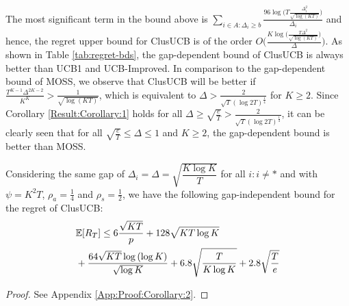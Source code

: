 The most significant term in the bound above is $\sum_{i\in A:\Delta_{i}\geq b}\frac{96\log{\big(T\frac{\Delta_{i}^{2}}{\sqrt{\log (KT)}}\big)}}{\Delta_{i}}$ and hence, the regret upper bound for ClusUCB is of the order $O\bigg(\frac{K\log \big(\frac{T\Delta^{2}}{\sqrt{\log (KT)}}\big)}{\Delta}\bigg)$. As shown in Table \ref{tab:regret-bds}, the gap-dependent bound of ClusUCB is always better than UCB1 and UCB-Improved. 
%
In comparison to the gap-dependent bound of MOSS, we observe that ClusUCB will be better if 
$\frac{T^{K-1}\Delta^{2K-2}}{K^{K}} > \frac{1}{\sqrt{\log(KT)}}$, which is equivalent to $\Delta > \frac{2}{\sqrt{T}(\log 2T)^{\frac{1}{4}}}$ for
$K\geq 2$. Since Corollary \ref{Result:Corollary:1} holds for all $\Delta \geq \sqrt{\frac{e}{T}} > \frac{2}{\sqrt{T}(\log 2T)^{\frac{1}{4}}}$, it can be clearly seen that for all $\sqrt{\frac{e}{T}} \leq \Delta\leq 1$ and $K\geq 2$, the gap-dependent bound is better than MOSS.

\begin{corollary}
\label{Result:Corollary:2}
Considering the same gap of $\Delta_{i} = \Delta =\sqrt{\dfrac{K\log K}{T}}$ for all ${i:i\neq *}$ and with $\psi=K^{2}T$, $\rho_{a}=\frac{1}{4}$ and $\rho_{s}=\frac{1}{2}$, 
 we have the following gap-independent bound for the regret of ClusUCB:
\begin{align*}
&\mathbb{E} [R_T] \le  6\dfrac{\sqrt{KT}}{p} + 128\sqrt{KT\log K} \\
 &+ \dfrac{64\sqrt{KT}\log{(\log K)}}{\sqrt{\log K}}+ 6.8\sqrt{\dfrac{T}{K\log K}} + 2.8\sqrt{\dfrac{T}{e}}
\end{align*}
\end{corollary}
\begin{proof}
 See Appendix \ref{App:Proof:Corollary:2}.
\end{proof}



